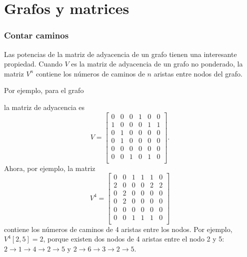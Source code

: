 \section{Grafos y matrices}

\subsubsection{Contar caminos}

Las potencias de la matriz de adyacencia de un grafo tienen una interesante
propiedad. Cuando $V$ es la matriz de adyacencia de un grafo no ponderado,
la matriz $V^n$ contiene los números de caminos de $n$ aristas entre nodos del
grafo.

Por ejemplo, para el grafo
\begin{center}
\end{center}
la matriz de adyacencia es
\[
    V= \begin{bmatrix}
        0 & 0 & 0 & 1 & 0 & 0 \\
        1 & 0 & 0 & 0 & 1 & 1 \\
        0 & 1 & 0 & 0 & 0 & 0 \\
        0 & 1 & 0 & 0 & 0 & 0 \\
        0 & 0 & 0 & 0 & 0 & 0 \\
        0 & 0 & 1 & 0 & 1 & 0 \\
    \end{bmatrix}.
\]
Ahora, por ejemplo, la matriz
\[
    V^4= \begin{bmatrix}
        0 & 0 & 1 & 1 & 1 & 0 \\
        2 & 0 & 0 & 0 & 2 & 2 \\
        0 & 2 & 0 & 0 & 0 & 0 \\
        0 & 2 & 0 & 0 & 0 & 0 \\
        0 & 0 & 0 & 0 & 0 & 0 \\
        0 & 0 & 1 & 1 & 1 & 0 \\
    \end{bmatrix}
\]
contiene los números de caminos de 4 aristas entre los nodos. Por ejemplo,
$V^4[2,5]=2$, porque existen dos nodos de 4 aristas entre el nodo 2 y 5:
$2 \rightarrow 1 \rightarrow 4 \rightarrow 2 \rightarrow 5$
y
$2 \rightarrow 6 \rightarrow 3 \rightarrow 2 \rightarrow 5$.

